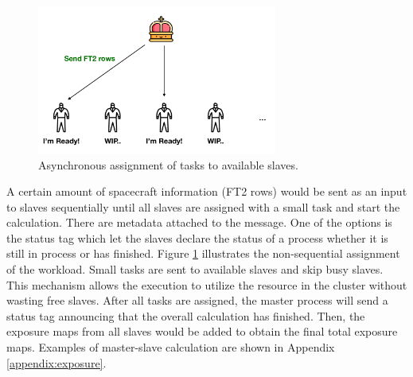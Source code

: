 \begin{figure}[h!]
    \centering
    \includegraphics[width=0.7\textwidth]{content/methodology/figures/ms3}
    \caption{Asynchronous assignment of tasks to available slaves.}
    \label{fig:ms3}
\end{figure}

A certain amount of spacecraft information (FT2 rows)
would be sent as an input to slaves sequentially
until all slaves are assigned with a small task
and start the calculation.
There are metadata attached
to the message. 
One of the options is the status tag
which let the slaves declare the status of a process
whether it is still in process or has finished.
Figure \ref{fig:ms3} illustrates 
the non-sequential assignment of the workload.
Small tasks are sent to available slaves and skip busy slaves.
This mechanism allows the execution to utilize 
the resource in the cluster without wasting
free slaves. After all tasks are assigned,
the master process will send a status tag announcing
that the overall calculation has finished.
Then, the exposure maps from all slaves would be added
to obtain the final total exposure maps.
Examples of master-slave calculation are shown in Appendix \ref{appendix:exposure}.




